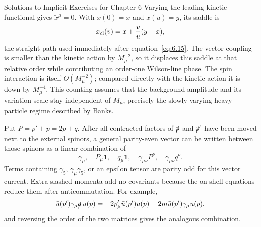\begin{bankssolutions}{Solutions to Implicit Exercises for Chapter 6}
Varying the leading kinetic functional gives \(\ddot x^\mu=0\).  With
\(x(0)=x\) and \(x(u)=y\), its saddle is
\begin{equation*}
 x_{\rm cl}(v)=x+\frac vu(y-x),
\end{equation*}
the straight path used immediately after equation~\eqref{eq:6.15}.  The
vector coupling is smaller than the kinetic action by \(M_\mu^{-2}\), so
it displaces this saddle at that relative order while contributing an
order-one Wilson-line phase.  The spin interaction is itself
\(O(M_\mu^{-2})\); compared directly with the kinetic action it is down by
\(M_\mu^{-4}\).  This counting assumes that the background amplitude and
its variation scale stay independent of \(M_\mu\), precisely the slowly
varying heavy-particle regime described by Banks.

Put \(P=p'+p=2p+q\).  After all contracted factors of \(\slashed p\) and
\(\slashed p'\) have been moved next to the external spinors, a general
parity-even vector can be written between those spinors as a linear
combination of
\begin{equation*}
 \gamma_\mu,\quad P_\mu\mathbf1,\quad q_\mu\mathbf1,
 \quad\gamma_{\mu\nu}P^\nu,\quad\gamma_{\mu\nu}q^\nu.
\end{equation*}
Terms containing \(\gamma_5\), \(\gamma_\mu\gamma_5\), or an epsilon
tensor are parity odd for this vector current.  Extra slashed momenta add no
covariants because the on-shell equations reduce them after anticommutation.
For example,
\begin{equation*}
 \bar u(p')\gamma_\mu\slashed q\,u(p)
 =-2p'_\mu\bar u(p')u(p)-2m\bar u(p')\gamma_\mu u(p),
\end{equation*}
and reversing the order of the two matrices gives the analogous combination.


\end{bankssolutions}

